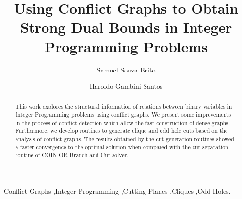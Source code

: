 \documentclass[preprint,12pt]{elsarticle}
\begin{document}
\begin{frontmatter}



\title{Using Conflict Graphs to Obtain Strong Dual Bounds in Integer Programming Problems}


\author[samuel]{Samuel Souza Brito}
\address[samuel]{Departamento de Computação e Sistemas de Informação, Universidade Federal de Ouro Preto, Brazil}

\author[haroldo]{Haroldo Gambini Santos}
\address[haroldo]{Departamento de Computação, Universidade Federal de Ouro Preto, Brazil}

\begin{abstract}
This work explores the structural information of relations between binary variables in Integer Programming problems using conflict graphs. We present some improvements in the process of conflict detection which allow the fast construction of dense graphs. Furthermore, we develop routines to generate clique and odd hole cuts based on the analysis of conflict graphs. The results obtained by the cut generation routines showed a faster convergence to the optimal solution when compared with the cut separation routine of COIN-OR Branch-and-Cut solver.
\end{abstract}

\begin{keyword}
Conflict Graphs \sep Integer Programming \sep Cutting Planes \sep Cliques \sep Odd Holes.



\end{keyword}

\end{frontmatter}
\end{document}
